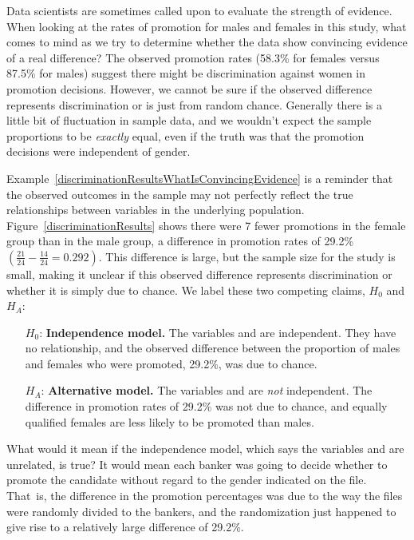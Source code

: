 \begin{example}{Data scientists are sometimes called upon to evaluate the strength of evidence. When looking at the rates of promotion for males and females in this study, what comes to mind as we try to determine whether the data show convincing evidence of a real difference?} \label{discriminationResultsWhatIsConvincingEvidence}
The observed promotion rates (58.3\% for females versus 87.5\% for males) suggest there might be discrimination against women in promotion decisions. However, we cannot be sure if the observed difference represents discrimination or is just from random chance. Generally there is a little bit of fluctuation in sample data, and we wouldn't expect the sample proportions to be \emph{exactly} equal, even if the truth was that the promotion decisions were independent of gender.
\end{example}

Example~\ref{discriminationResultsWhatIsConvincingEvidence} is a reminder that the observed outcomes in the sample may not perfectly reflect the true relationships between variables in the underlying population. Figure~\ref{discriminationResults} shows there were 7 fewer promotions in the female group than in the male group, a difference in promotion rates of 29.2\% $\left( \frac{21}{24} - \frac{14}{24} = 0.292 \right)$. This difference is large, but the sample size for the study is small, making it unclear if this observed difference represents discrimination or whether it is simply due to chance. We label these two competing claims, $H_0$ and $H_A$:
\begin{itemize}
\setlength{\itemsep}{0mm}
\item[$H_0$:] \textbf{Independence model.} The variables  and  are independent. They have no relationship, and the observed difference between the proportion of males and females who were promoted, 29.2\%, was due to chance.
\item[$H_A$:] \textbf{Alternative model.} The variables  and  are \emph{not} independent. The difference in promotion rates of 29.2\% was not due to chance, and equally qualified females are less likely to be promoted than males.
\end{itemize}

What would it mean if the independence model, which says the variables  and  are unrelated, is true? It would mean each banker was going to decide whether to promote the candidate without regard to the gender indicated on the file. That~is, the difference in the promotion percentages was due to the way the files were randomly divided to the bankers, and the randomization just happened to give rise to a relatively large difference of 29.2\%.

